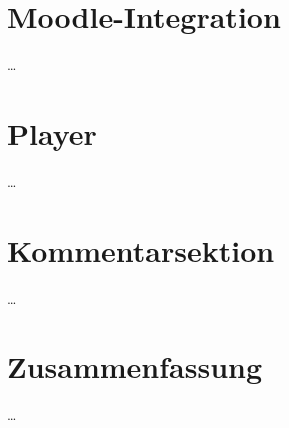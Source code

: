 \section{Moodle-Integration}
\dots


\section{Player}
\dots


\section{Kommentarsektion}
\dots


\section{Zusammenfassung}
\dots